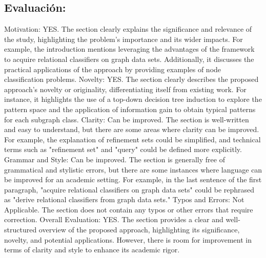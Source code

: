 \documentclass{article}%
\begin{document}
\subsection{Evaluación:}%
\label{subsec:Evaluacin}%
\newline%
Motivation: YES. The section clearly explains the significance and relevance of the study, highlighting the problem's importance and its wider impacts. For example, the introduction mentions leveraging the advantages of the framework to acquire relational classifiers on graph data sets. Additionally, it discusses the practical applications of the approach by providing examples of node classification problems.\newline%
\newline%
Novelty: YES. The section clearly describes the proposed approach's novelty or originality, differentiating itself from existing work. For instance, it highlights the use of a top{-}down decision tree induction to explore the pattern space and the application of information gain to obtain typical patterns for each subgraph class.\newline%
\newline%
Clarity: Can be improved. The section is well{-}written and easy to understand, but there are some areas where clarity can be improved. For example, the explanation of refinement sets could be simplified, and technical terms such as "refinement set" and "query" could be defined more explicitly.\newline%
\newline%
Grammar and Style: Can be improved. The section is generally free of grammatical and stylistic errors, but there are some instances where language can be improved for an academic setting. For example, in the last sentence of the first paragraph, "acquire relational classifiers on graph data sets" could be rephrased as "derive relational classifiers from graph data sets."\newline%
\newline%
Typos and Errors: Not Applicable. The section does not contain any typos or other errors that require correction.\newline%
\newline%
Overall Evaluation: YES. The section provides a clear and well{-}structured overview of the proposed approach, highlighting its significance, novelty, and potential applications. However, there is room for improvement in terms of clarity and style to enhance its academic rigor.
\end{document}
